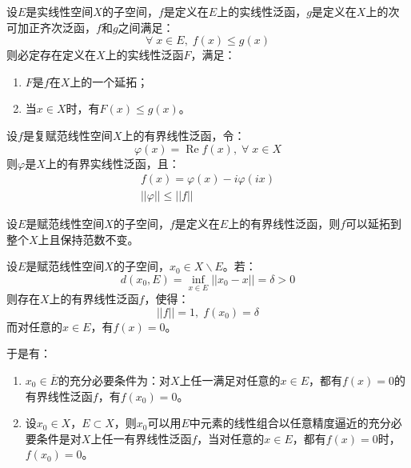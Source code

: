 \begin{theorem}
	设$E$是实线性空间$X$的子空间，$f$是定义在$E$上的实线性泛函，$g$是定义在$X$上的次可加正齐次泛函，$f$和$g$之间满足：
	\begin{equation*}
		\forall\;x\in E,\;f(x)\leqslant g(x)
	\end{equation*}
	则必定存在定义在$X$上的实线性泛函$F$，满足：
	\begin{enumerate}
		\item $F$是$f$在$X$上的一个延拓；
		\item 当$x\in X$时，有$F(x)\leqslant g(x)$。
	\end{enumerate}
\end{theorem}
\begin{corollary}
	设$f$是复赋范线性空间$X$上的有界线性泛函，令：
	\begin{equation*}
		\varphi(x)=\operatorname{Re}f(x),\;\forall\;x\in X
	\end{equation*}
	则$\varphi$是$X$上的有界实线性泛函，且：
	\begin{gather*}
		f(x)=\varphi(x)-i\varphi(ix) \\
		||\varphi||\leqslant||f||
	\end{gather*}
\end{corollary}
\begin{theorem}
	设$E$是赋范线性空间$X$的子空间，$f$是定义在$E$上的有界线性泛函，则$f$可以延拓到整个$X$上且保持范数不变。
\end{theorem}
\begin{corollary}
	设$E$是赋范线性空间$X$的子空间，$x_0\in X\backslash E$。若：
	\begin{equation*}
		d(x_0,E)=\inf_{x\in E}||x_0-x||=\delta>0
	\end{equation*}
	则存在$X$上的有界线性泛函$f$，使得：
	\begin{equation*}
		||f||=1,\;f(x_0)=\delta
	\end{equation*}
	而对任意的$x\in E$，有$f(x)=0$。\par
	于是有：
	\begin{enumerate}
		\item $x_0\in\overline{E}$的充分必要条件为：对$X$上任一满足对任意的$x\in E$，都有$f(x)=0$的有界线性泛函$f$，有$f(x_0)=0$。
		\item 设$x_0\in X$，$E\subset X$，则$x_0$可以用$E$中元素的线性组合以任意精度逼近的充分必要条件是对$X$上任一有界线性泛函$f$，当对任意的$x\in E$，都有$f(x)=0$时，$f(x_0)=0$。
	\end{enumerate}
\end{corollary}

